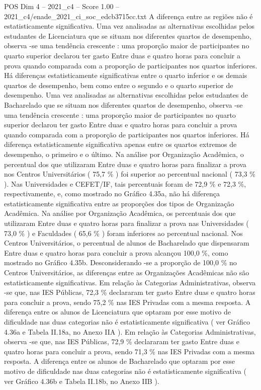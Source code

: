 \begin{textsample}{POS Dim 4 – 2021\_c4 – Score 1.00 – 2021\_c4/enade\_2021\_ci\_soc\_edcb3715cc.txt}
A diferença entre as regiões não é estatisticamente significativa.
Uma vez analisadas as alternativas escolhidas pelos estudantes de Licenciatura que se situam nos diferentes quartos de desempenho, observa -se uma tendência crescente : uma proporção maior de participantes no quarto superior declarou ter gasto Entre duas e quatro horas para concluir a prova quando comparada com a proporção de participantes nos quartos inferiores.
Há diferenças estatisticamente significativas entre o quarto inferior e os demais quartos de desempenho, bem como entre o segundo e o quarto superior de desempenho.
Uma vez analisadas as alternativas escolhidas pelos estudantes de Bacharelado que se situam nos diferentes quartos de desempenho, observa -se uma tendência crescente : uma proporção maior de participantes no quarto superior declarou ter gasto Entre duas e quatro horas para concluir a prova quando comparada com a proporção de participantes nos quartos inferiores.
Há diferença estatisticamente significativa apenas entre os quartos extremos de desempenho, o primeiro e o último.
Na análise por Organização Acadêmica, o percentual dos que utilizaram Entre duas e quatro horas para finalizar a prova nos Centros Universitários ( 75,7 \% ) foi superior ao percentual nacional ( 73,3 \% ).
Nas Universidades e CEFET/IF, tais percentuais foram de 72,9 \% e 72,3 \%, respectivamente, e, como mostrado no Gráfico 4.35a, não há diferença estatisticamente significativa entre as proporções dos tipos de Organização Acadêmica.
Na análise por Organização Acadêmica, os percentuais dos que utilizaram Entre duas e quatro horas para finalizar a prova nas Universidades ( 73,0 \% ) e Faculdades ( 65,6 \% ) foram inferiores ao percentual nacional.
Nos Centros Universitários, o percentual de alunos de Bacharelado que dispensaram Entre duas e quatro horas para concluir a prova alcançou 100,0 \%, como mostrado no Gráfico 4.35b.
Desconsiderando -se a proporção de 100,0 \% no Centros Universitários, as diferenças entre as Organizações Acadêmicas não são estatisticamente significativas.
Em relação às Categorias Administrativas, observa -se que, nas IES Públicas, 72,3 \% declararam ter gasto Entre duas e quatro horas para concluir a prova, sendo 75,2 \% nas IES Privadas com a mesma resposta.
A diferença entre os alunos de Licenciatura que optaram por esse motivo de dificuldade nas duas categorias não é estatisticamente significativa ( ver Gráfico 4.36a e Tabela II.18a, no Anexo IIA ).
Em relação às Categorias Administrativas, observa -se que, nas IES Públicas, 72,9 \% declararam ter gasto Entre duas e quatro horas para concluir a prova, sendo 71,3 \% nas IES Privadas com a mesma resposta.
A diferença entre os alunos de Bacharelado que optaram por esse motivo de dificuldade nas duas categorias não é estatisticamente significativa ( ver Gráfico 4.36b e Tabela II.18b, no Anexo IIB ).

\end{textsample}
